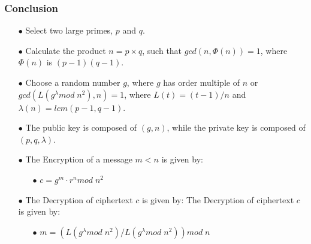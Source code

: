 \documentclass[xcolor=table]{beamer}
\begin{document}
\begin{frame}
\frametitle{Conclusion}

\begin{itemize} \itemsep5pt \parskip0pt 
  \item[$\bullet$] Select two large primes, $p$ and $q$. 
  \item[$\bullet$] Calculate the product $n=p\times q$, such that $gcd(n,\Phi(n)) = 1$, where $\Phi(n)$ is $(p-1)(q-1)$.
  \item[$\bullet$] Choose a random number $g$, where $g$ has order multiple of $n$ or $gcd(L(g^\lambda mod \; n^2 ),n) = 1$, where $L(t)= (t-1) / n$ and $\lambda(n)=lcm(p-1, q-1)$.
  \item[$\bullet$] The public key is composed of $(g, n)$, while the private key is composed of $(p,q,\lambda)$. 
  \item[$\bullet$] The Encryption of a message $m < n$ is given by: 
  \begin{itemize} \itemsep10pt \parskip0pt 
    \item[$\bullet$] $c=g^m\cdot r^n mod\; n^2$
  \end{itemize}
  \item[$\bullet$] The Decryption of ciphertext $c$ is given by: The Decryption of ciphertext $c$ is given by: 
  \begin{itemize} \itemsep10pt \parskip0pt 
    \item[$\bullet$] $m=(L(g^{\lambda} mod\; n^2 )/L(g^{\lambda} mod\; n^2 ) )mod \; n$
  \end{itemize}
\end{itemize}

\end{frame}






\end{document}
